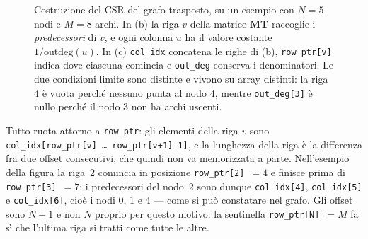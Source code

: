 \documentclass[11pt,a4paper]{article}
\newcommand{\stacco}{\par\medskip\noindent}
\begin{document}
\begin{figure}[htbp]
\caption{Costruzione del CSR del grafo trasposto, su un esempio con $N=5$
nodi e $M=8$ archi. In (b) la riga $v$ della matrice $\mathbf{MT}$ raccoglie i
\emph{predecessori} di $v$, e ogni colonna $u$ ha il valore costante
$1/\mathrm{outdeg}(u)$. In (c) \texttt{col\_idx} concatena le righe di (b),
\texttt{row\_ptr[v]} indica dove ciascuna comincia e
\texttt{out\_deg} conserva i denominatori. Le due condizioni limite sono
distinte e vivono su array distinti: la riga 4 è vuota perché nessuno punta al
nodo 4, mentre \texttt{out\_deg[3]} è nullo perché il nodo 3 non ha archi
uscenti.}
\label{fig:csr}
\end{figure}

\stacco
Tutto ruota attorno a \texttt{row\_ptr}: gli elementi della riga $v$ sono
\texttt{col\_idx[row\_ptr[v] \dots\ row\_ptr[v+1]-1]}, e la lunghezza della
riga è la differenza fra due offset consecutivi, che quindi non va
memorizzata a parte. Nell'esempio della figura la riga~2 comincia in posizione
\texttt{row\_ptr[2]}~$=4$ e finisce prima di \texttt{row\_ptr[3]}~$=7$: i
predecessori del nodo~2 sono dunque \texttt{col\_idx[4]}, \texttt{col\_idx[5]}
e \texttt{col\_idx[6]}, cioè i nodi $0$, $1$ e $4$ --- come si può constatare
nel grafo. Gli offset sono $N+1$ e non $N$ proprio per questo motivo:
la sentinella \texttt{row\_ptr[N]}~$=M$ fa sì che l'ultima riga si tratti come
tutte le altre.
\end{document}
